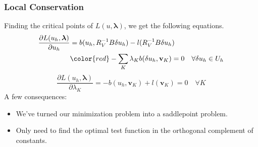 \documentclass[mathserif]{beamer}
\def\blambda{\boldsymbol\lambda}
\begin{document}
\begin{frame}
\frametitle{Local Conservation}
Finding the critical points of $L(u,\blambda)$, we get the following
equations.
\begin{align*}
\frac{\partial L(u_h,\blambda)}{\partial u_h}&=b(u_h,R_V^{-1}B\delta u_h)
-l(R_V^{-1}B\delta u_h)\\
&{\color{red}-\sum_K\lambda_K b(\delta
u_h,\mathbf{v}_K)}=0\quad\forall\delta u_h\in U_h
\end{align*}
\[
\frac{\partial
L(u_h,\blambda)}{\partial\lambda_K}=-b(u_h,\mathbf{v}_K)+l(\mathbf{v}_K)=0\quad\forall
K
\]
A few consequences:
\begin{itemize}
\item We've turned our minimization problem into a saddlepoint problem.
\item Only need to find the optimal test function in the orthogonal complement
of constants. %
\end{itemize}
\end{frame}
\begin{comment}
Now, proceeding forward again and setting the derivatives to zero, we have
turned our minimization problem into a saddle point problem. Note that we have
added extra DOFs equal to the number of mesh elements, but the structure of
the problem allows these to be statically condensed out. The most interesting
consequence of this modification (apart from enforcing local conservation) is
that we can modify the search space for our optimal test functions to be
the orthogonal complement of constants.

?? Is there a modified source term?
\end{comment}
\end{document}
